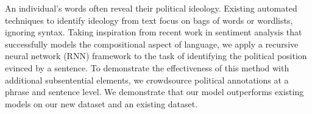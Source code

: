 An individual's words often reveal their political ideology. Existing automated techniques to identify ideology from text focus on bags of words or wordlists, ignoring syntax. Taking inspiration from recent work in sentiment analysis that successfully models the compositional aspect of language, we apply a recursive neural network (RNN) framework to the task of identifying the political position evinced by a sentence. To demonstrate the effectiveness of this method with additional subsentential elements, we crowdsource political annotations at a phrase and sentence level. We demonstrate that our model outperforms existing models on our new dataset and an existing dataset.
